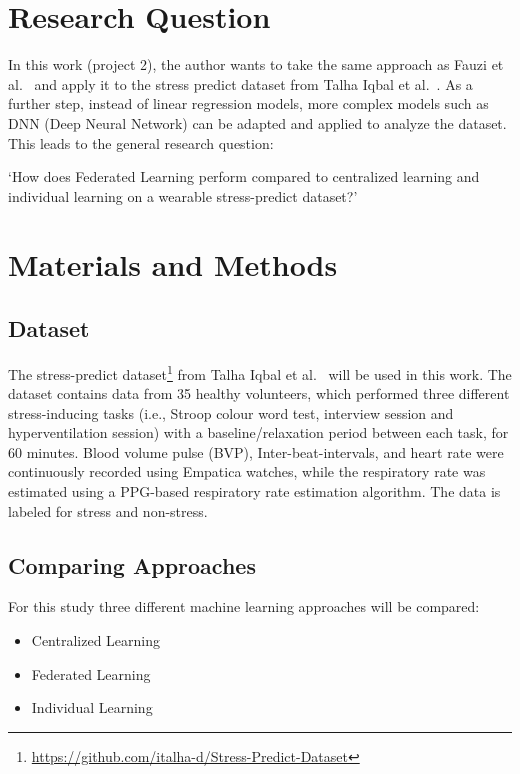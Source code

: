 \documentclass[
   fontsize=10.5pt,
   invert-title=true,
   titlepage=false,
   titleimage-ratio=13,
   class=article,
   twocolumn,
   parskip=half-
]{bfhpub}				%
\begin{document}
\section{Research Question}
In this work (project 2), the author wants to take the same approach as Fauzi et
al.~\cite{fauzi_comparative_2022} and apply it to the stress predict dataset
from Talha Iqbal et al.~\cite{iqbal_stress_2022}. As a further step, instead of
linear regression models, more complex models such as DNN (Deep Neural Network)
can be adapted and applied to analyze the dataset. This leads to the general
research question:
\begin{displayquote}
  `How does Federated Learning perform compared to centralized learning and
  individual learning on a wearable stress-predict dataset?'
\end{displayquote}

\section{Materials and Methods}
\subsection{Dataset}
The stress-predict dataset\footnote{\url{https://github.com/italha-d/Stress-Predict-Dataset}} from Talha Iqbal et al.~\cite{iqbal_stress_2022} will
be used in this work. The dataset contains data from 35 healthy volunteers,
which performed three different stress-inducing tasks (i.e., Stroop colour word
test, interview session and hyperventilation session) with a baseline/relaxation
period between each task, for 60 minutes. Blood volume pulse (BVP),
Inter-beat-intervals, and heart rate were continuously recorded using Empatica
watches, while the respiratory rate was estimated using a PPG-based respiratory
rate estimation algorithm. The data is labeled for stress and non-stress.

\subsection{Comparing Approaches}
For this study three different machine learning approaches will be compared:
\begin{itemize}
  \item Centralized Learning
  \item Federated Learning
  \item Individual Learning
\end{itemize}
\end{document}
